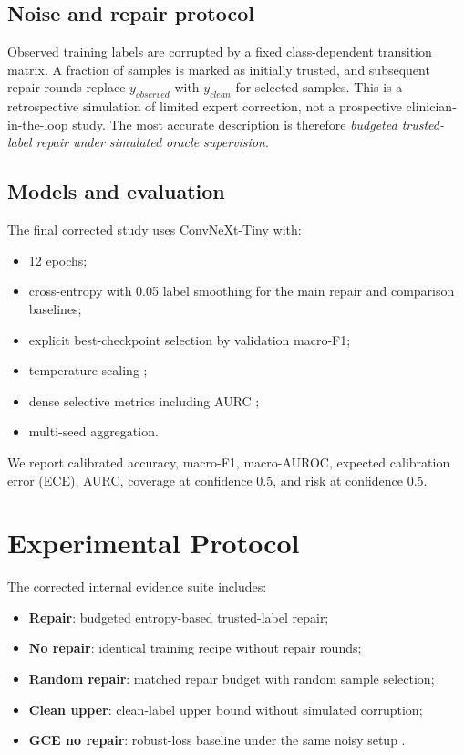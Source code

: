\documentclass[11pt]{article}
\begin{document}
\subsection{Noise and repair protocol}

Observed training labels are corrupted by a fixed class-dependent transition matrix. A fraction of samples is marked as initially trusted, and subsequent repair rounds replace $y_{observed}$ with $y_{clean}$ for selected samples. This is a retrospective simulation of limited expert correction, not a prospective clinician-in-the-loop study. The most accurate description is therefore \textit{budgeted trusted-label repair under simulated oracle supervision}.

\subsection{Models and evaluation}

The final corrected study uses ConvNeXt-Tiny \citep{liu2022convnet} with:

\begin{itemize}
  \item 12 epochs;
  \item cross-entropy with 0.05 label smoothing \citep{szegedy2016inception} for the main repair and comparison baselines;
  \item explicit best-checkpoint selection by validation macro-F1;
  \item temperature scaling \citep{guo2017calibration};
  \item dense selective metrics including AURC \citep{geifman2017selective};
  \item multi-seed aggregation.
\end{itemize}

We report calibrated accuracy, macro-F1, macro-AUROC, expected calibration error (ECE), AURC, coverage at confidence 0.5, and risk at confidence 0.5.

\section{Experimental Protocol}

The corrected internal evidence suite includes:

\begin{itemize}
  \item \textbf{Repair}: budgeted entropy-based trusted-label repair;
  \item \textbf{No repair}: identical training recipe without repair rounds;
  \item \textbf{Random repair}: matched repair budget with random sample selection;
  \item \textbf{Clean upper}: clean-label upper bound without simulated corruption;
  \item \textbf{GCE no repair}: robust-loss baseline under the same noisy setup \citep{zhang2018gce}.
\end{itemize}
\end{document}

